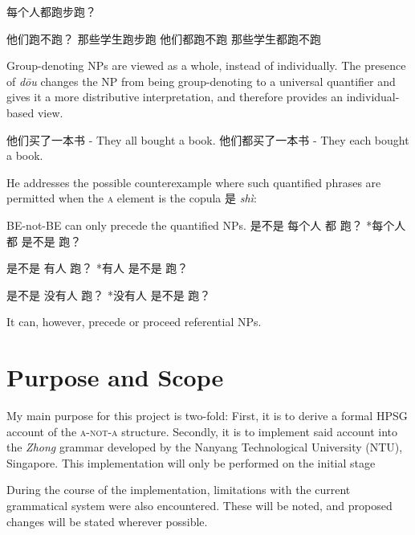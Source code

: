 \documentclass[12pt, UTF8]{article}
\begin{document}
每个人都跑步跑？

他们跑不跑？
那些学生跑步跑
他们都跑不跑
那些学生都跑不跑

Group-denoting NPs are viewed as a whole, instead of individually.
The presence of \textit{d\={o}u} changes the NP from being group-denoting to a universal quantifier and gives it a more distributive interpretation, and therefore provides an individual-based view.

他们买了一本书 - They all bought a book.
他们都买了一本书 - They each bought a book.


He addresses the possible counterexample where such quantified phrases are permitted when the \textsc{a} element is the copula 是 \textit{sh\`{i}}:

BE-not-BE can only precede the quantified NPs.
是不是 每个人 都 跑？
*每个人 都 是不是 跑？

是不是 有人 跑？
*有人 是不是 跑？

是不是 没有人 跑？
*没有人 是不是 跑？

It can, however, precede or proceed referential NPs.



\newpage

\section{Purpose and Scope}

My main purpose for this project is two-fold: First, it is to derive a formal HPSG account of the \textsc{a-not-a} structure. Secondly, it is to implement said account into the \textit{Zhong} grammar developed by the Nanyang Technological University (NTU), Singapore. This implementation will only be performed on the initial stage

During the course of the implementation, limitations with the current grammatical system were also encountered. These will be noted, and proposed changes will be stated wherever possible.


\end{document}
